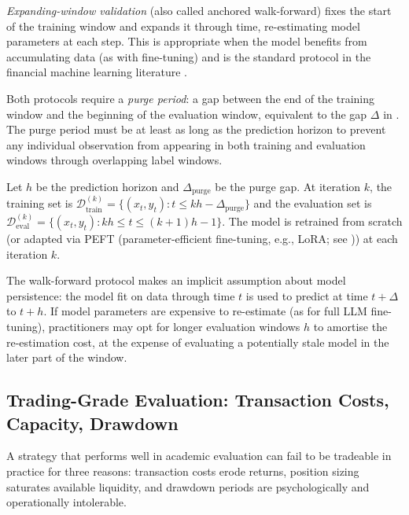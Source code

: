 \emph{Expanding-window validation} (also called anchored walk-forward) fixes the
start of the training window and expands it through time, re-estimating model
parameters at each step. This is appropriate when the model benefits from
accumulating data (as with fine-tuning) and is the standard protocol in the
financial machine learning literature \cite{lopezdeprado2018advances}.

Both protocols require a \emph{purge period}: a gap between the end of the training
window and the beginning of the evaluation window, equivalent to the gap $\Delta$ in
. The purge period must be at least as long
as the prediction horizon to prevent any individual observation from appearing in both
training and evaluation windows through overlapping label windows.

\begin{definition}
\label{def:ch13-walk-forward}
Let $h$ be the prediction horizon and $\Delta_{\text{purge}}$ be the purge gap.
At iteration $k$, the training set is $\mathcal{D}_{\text{train}}^{(k)} =
\{(x_t, y_t) : t \leq kh - \Delta_{\text{purge}}\}$ and the evaluation set is
$\mathcal{D}_{\text{eval}}^{(k)} = \{(x_t, y_t) : kh \leq t \leq (k+1)h - 1\}$.
The model is retrained from scratch (or adapted via PEFT (parameter-efficient fine-tuning, e.g., LoRA; see )) at each iteration $k$.
\end{definition}

The walk-forward protocol makes an implicit assumption about model persistence: the
model fit on data through time $t$ is used to predict at time $t + \Delta$ to
$t + h$. If model parameters are expensive to re-estimate (as for full LLM fine-tuning),
practitioners may opt for longer evaluation windows $h$ to amortise the re-estimation
cost, at the expense of evaluating a potentially stale model in the later part of
the window.

\subsection{Trading-Grade Evaluation: Transaction Costs, Capacity, Drawdown}
\label{sec:ch13-trading-grade-evaluation}

A strategy that performs well in academic evaluation can fail to be tradeable in
practice for three reasons: transaction costs erode returns, position sizing saturates
available liquidity, and drawdown periods are psychologically and operationally
intolerable.

